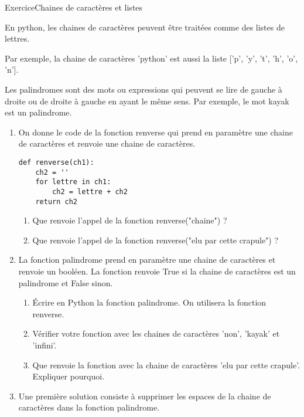 \documentclass[11pt,a4paper]{article}
\newcounter{numexo}
\begin{document}
\begin{NSI}
{Exercice}{Chaines de caractères et listes}
\end{NSI}




En python, les chaines de caractères peuvent être traitées comme des listes de lettres. \medskip

Par exemple, la chaine de caractères \textsf{'python'} est aussi la liste \textsf{['p', 'y', 't', 'h', 'o', 'n']}.\medskip


Les palindromes sont des mots ou expressions qui peuvent se lire de gauche à droite ou de droite à gauche en ayant le même sens. Par exemple, le mot \textsf{kayak} est un palindrome.

\begin{enumerate}
\item On donne le code de la fonction \textsf{renverse} qui prend en paramètre une chaine de caractères et renvoie une chaine de caractères.

\begin{lstlisting}
def renverse(ch1):
	ch2 = ''
	for lettre in ch1:
		ch2 = lettre + ch2
	return ch2
\end{lstlisting}

\begin{enumerate}
\item Que renvoie l'appel de la fonction \textsf{renverse("chaine")} ?
\item Que renvoie l'appel de la fonction \textsf{renverse("elu par cette crapule")} ?
\end{enumerate}
\item La fonction \textsf{palindrome} prend en paramètre une chaine de caractères et renvoie un booléen. La fonction renvoie \textsf{True} si la chaine de caractères est un palindrome et \textsf{False} sinon.
\begin{enumerate}
\item Écrire en Python la fonction \textsf{palindrome}. On utilisera la fonction \textsf{renverse}.
\item Vérifier votre fonction avec les chaines de caractères \textsf{'non'}, \textsf{'kayak'} et \textsf{'infini'}.
\item Que renvoie la fonction avec la chaine de caractères \textsf{'elu par cette crapule'}. Expliquer pourquoi.
\end{enumerate}
\item Une première solution consiste à supprimer les espaces de la chaine de caractères dans la fonction \textsf{palindrome}.
\end{enumerate}
\end{document}
